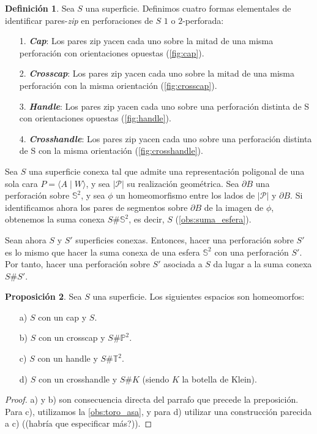 \documentclass[10pt]{report}
\newcommand{\Esfera}{\mathbb{S}^2}
\newcommand{\Toro}{\mathbb{T}^2}
\newcommand{\Proyectivo}{\mathbb{P}^2}
\newcommand{\enfatiza}[1]{\textbf{\textit{#1}}}
\theoremstyle{definition}
\newtheorem{defin}{Definición}[section]
\newtheorem{prop}[defin]{Proposición}
\begin{document}
\begin{defin}
Sea $S$ una superficie. Definimos cuatro formas elementales de identificar pares-\textit{zip} en perforaciones de 
$S$ $1$ o $2$-perforada:

\begin{itemize}
\item[1.] \enfatiza{Cap}: Los pares zip yacen cada uno sobre la mitad de una misma perforación con orientaciones opuestas (\autoref{fig:cap}).
\item[2.] \enfatiza{Crosscap}: Los pares zip yacen cada uno sobre la mitad de una misma perforación con la misma orientación (\autoref{fig:crosscap}).
\item[3.] \enfatiza{Handle}: Los pares zip yacen cada uno sobre una perforación distinta de S con orientaciones opuestas (\autoref{fig:handle}).
\item[4.] \enfatiza{Crosshandle}: Los pares zip yacen cada uno sobre una perforación distinta de S con la misma orientación (\autoref{fig:crosshandle}).
\end{itemize}
\end{defin}

Sea $S$ una superficie conexa tal que admite una representación poligonal de una sola cara $P=\langle A\mid W\rangle$, y sea $|\mathcal{P}|$ su realización geométrica. Sea $\partial B$ una perforación sobre $\Esfera$, y sea $\phi$ un homeomorfismo entre los lados de $|\mathcal{P}|$ y $\partial B$. Si identificamos ahora los pares de segmentos sobre $\partial B$ de la imagen de $\phi$, obtenemos la suma conexa $S\# \Esfera$, es decir, $S$ (\autoref{obs:suma_esfera}). 

Sean ahora $S$ y $S'$ superficies conexas. Entonces, hacer una perforación sobre $S'$ es lo mismo que hacer la suma conexa de una esfera $\Esfera$ con una perforación $S'$. Por tanto, hacer una perforación sobre $S'$ asociada a $S$ da lugar a la suma conexa $S\# S'$.
 

\begin{prop}
Sea $S$ una superficie. Los siguientes espacios son homeomorfos:
\begin{itemize}
\item[a)] $S$ con un cap y $S$.
\item[b)] $S$ con un crosscap y $S\# \Proyectivo$.
\item[c)] $S$ con un handle y $S\# \Toro$.
\item[d)] $S$ con un crosshandle y $S\# K$ (siendo $K$ la botella de Klein). 
\end{itemize}
\end{prop}
\begin{proof}
a) y b) son consecuencia directa del parrafo que precede la preposición. Para c), utilizamos la \autoref{obs:toro_asa}, y para d) utilizar una construcción parecida a c) ((habría que especificar más?)).
\end{proof}
\end{document}
